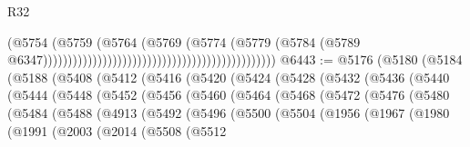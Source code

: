 \begin{lexlean}{R32}
\begin{coremodule}
                                                                                  (@5754
                                                                                    (@5759
                                                                                      (@5764
                                                                                        (@5769
                                                                                          (@5774
                                                                                            (@5779
                                                                                              (@5784
                                                                                                (@5789
                                                                                                  @6347)))))))))))))))))))))))))))))))))))))))))))))))
@6443 := @5176
    (@5180
      (@5184
        (@5188
          (@5408
            (@5412
              (@5416
                (@5420
                  (@5424
                    (@5428
                      (@5432
                        (@5436
                          (@5440
                            (@5444
                              (@5448
                                (@5452
                                  (@5456
                                    (@5460
                                      (@5464
                                        (@5468
                                          (@5472
                                            (@5476
                                              (@5480
                                                (@5484
                                                  (@5488
                                                    (@4913
                                                      (@5492
                                                        (@5496
                                                          (@5500
                                                            (@5504
                                                              (@1956
                                                                (@1967
                                                                  (@1980
                                                                    (@1991
                                                                      (@2003
                                                                        (@2014
                                                                          (@5508
                                                                            (@5512

\end{coremodule}
\end{lexlean}
